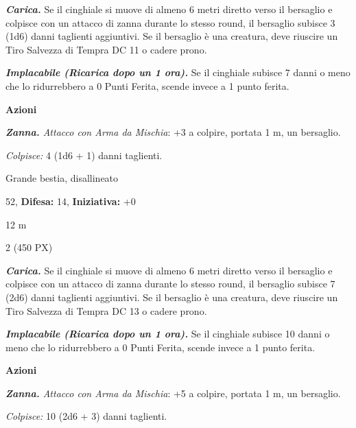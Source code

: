 \begin{multicols}{2}
{\emph{\textbf{Carica.}} Se il cinghiale si muove di almeno 6 metri diretto verso il bersaglio e colpisce con un attacco di zanna durante lo stesso round, il bersaglio subisce 3 (1d6) danni taglienti aggiuntivi. Se il bersaglio è una creatura, deve riuscire un Tiro Salvezza di Tempra DC 11 o cadere prono.

\emph{\textbf{Implacabile (Ricarica dopo un 1 ora).}} Se il cinghiale subisce 7 danni o meno che lo ridurrebbero a 0 Punti Ferita, scende invece a 1 punto ferita.

\textbf{Azioni}

\emph{\textbf{Zanna.} Attacco con Arma da Mischia}: +3 a colpire, portata 1 m, un bersaglio.

\emph{Colpisce:} 4 (1d6 + 1) danni taglienti.

\begin{description}[noitemsep, topsep=0pt, parsep=0pt, partopsep=0pt, leftmargin=0cm, labelwidth=2.2cm]
    \item[\textbf{Taglia/Tipo:}] Grande bestia, disallineato
    \item[\textbf{Caratt.:}] 
    \item[\textbf{Punti Ferita:}] 52,  \textbf{Difesa:} 14,  \textbf{Iniziativa:} +0
    \item[\textbf{Tiri Salvez.:}] 
    \item[\textbf{Movimento:}] 12 m
    \item[\textbf{Sfida:}] 2 (450 PX)\smallskip
\end{description}

\emph{\textbf{Carica.}} Se il cinghiale si muove di almeno 6 metri diretto verso il bersaglio e colpisce con un attacco di zanna durante lo stesso round, il bersaglio subisce 7 (2d6) danni taglienti aggiuntivi. Se il bersaglio è una creatura, deve riuscire un Tiro Salvezza di Tempra DC 13 o cadere prono.

\emph{\textbf{Implacabile (Ricarica dopo un 1 ora).}} Se il cinghiale subisce 10 danni o meno che lo ridurrebbero a 0 Punti Ferita, scende invece a 1 punto ferita.

\textbf{Azioni}

\emph{\textbf{Zanna.} Attacco con Arma da Mischia}: +5 a colpire, portata 1 m, un bersaglio.

\emph{Colpisce:} 10 (2d6 + 3) danni taglienti.

}
\end{multicols}
